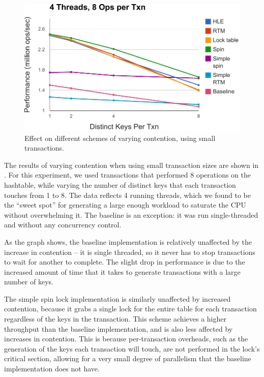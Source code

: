\begin{figure}[h!]
  \centering
  \includegraphics[scale=0.575]{figure/small_txns.pdf}
  \caption{Effect on different schemes of varying contention, using small
    transactions.}
  \label{fig:small_txns} 
\end{figure}

The results of varying contention when using small transaction sizes are shown
in . For this experiment, we used transactions that
performed 8 operations on the hashtable, while varying the number of distinct
keys that each transaction touches from 1 to 8. The data reflects 4 running
threads, which we found to be the ``sweet spot'' for generating a large enough
workload to saturate the CPU without overwhelming it. The baseline is an
exception: it was run single-threaded and without any concurrency control.

As the graph shows, the baseline implementation is relatively unaffected by the
increase in contention -- it is single threaded, so it never has to stop
transactions to wait for another to complete. The slight drop in performance is
due to the increased amount of time that it takes to generate transactions with
a large number of keys.

The simple spin lock implementation is similarly unaffected by increased
contention, because it grabs a single lock for the entire table for each
transaction regardless of the keys in the transaction. This scheme achieves a
higher throughput than the baseline implementation, and is also less affected by
increases in contention. This is because per-transaction overheads, such as
the generation of the keys each transaction will touch, are not performed in the
lock's critical section, allowing for a very small degree of parallelism that
the baseline implementation does not have.

